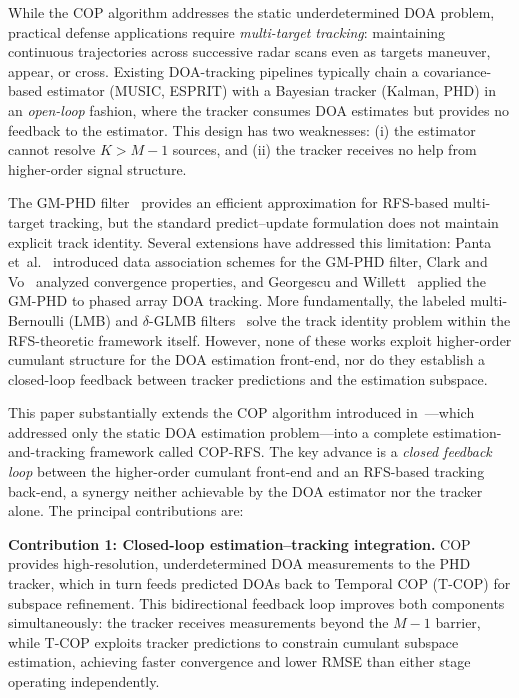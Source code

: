\documentclass[journal]{IEEEtran}
\begin{document}
While the COP algorithm addresses the static underdetermined DOA problem, practical defense applications require \emph{multi-target tracking}: maintaining continuous trajectories across successive radar scans even as targets maneuver, appear, or cross. Existing DOA-tracking pipelines typically chain a covariance-based estimator (MUSIC, ESPRIT) with a Bayesian tracker (Kalman, PHD) in an \emph{open-loop} fashion, where the tracker consumes DOA estimates but provides no feedback to the estimator. This design has two weaknesses: (i) the estimator cannot resolve $K > M-1$ sources, and (ii) the tracker receives no help from higher-order signal structure.

The GM-PHD filter~\cite{vo2006gmphd} provides an efficient approximation for RFS-based multi-target tracking, but the standard predict--update formulation does not maintain explicit track identity. Several extensions have addressed this limitation: Panta et~al.~\cite{panta2009gmphd} introduced data association schemes for the GM-PHD filter, Clark and Vo~\cite{clark2006gmphd_track} analyzed convergence properties, and Georgescu and Willett~\cite{georgescu2012phd_doa} applied the GM-PHD to phased array DOA tracking. More fundamentally, the labeled multi-Bernoulli (LMB) and $\delta$-GLMB filters~\cite{vo2014lmb} solve the track identity problem within the RFS-theoretic framework itself. However, none of these works exploit higher-order cumulant structure for the DOA estimation front-end, nor do they establish a closed-loop feedback between tracker predictions and the estimation subspace.

This paper substantially extends the COP algorithm introduced in~\cite{choi2015underdetermined}---which addressed only the static DOA estimation problem---into a complete estimation-and-tracking framework called COP-RFS. The key advance is a \emph{closed feedback loop} between the higher-order cumulant front-end and an RFS-based tracking back-end, a synergy neither achievable by the DOA estimator nor the tracker alone. The principal contributions are:

\textbf{Contribution 1: Closed-loop estimation--tracking integration.}
COP provides high-resolution, underdetermined DOA measurements to the PHD tracker, which in turn feeds predicted DOAs back to Temporal COP (T-COP) for subspace refinement. This bidirectional feedback loop improves both components simultaneously: the tracker receives measurements beyond the $M{-}1$ barrier, while T-COP exploits tracker predictions to constrain cumulant subspace estimation, achieving faster convergence and lower RMSE than either stage operating independently.
\end{document}
